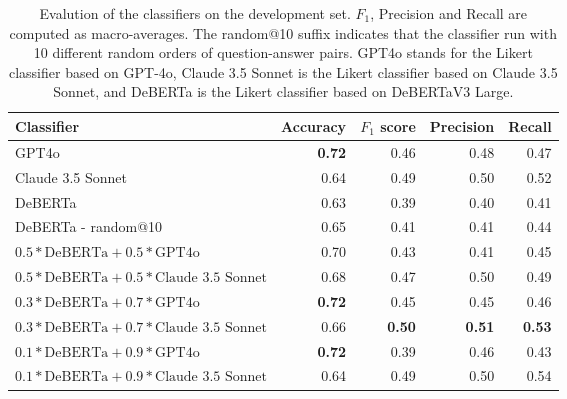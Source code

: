 \begin{table*}
    \centering
    \begin{tabular}{lrrrr}
        \toprule
        Classifier & Accuracy & $F_1$ score & Precision & Recall \\
        \midrule
        GPT4o & \textbf{0.72} & 0.46 & 0.48 & 0.47 \\
        Claude 3.5 Sonnet & 0.64 & 0.49 & 0.50 & 0.52 \\
        DeBERTa & 0.63 & 0.39 & 0.40 & 0.41 \\
        DeBERTa - random@10 & 0.65 & 0.41 & 0.41 & 0.44 \\
        $0.5*\mbox{DeBERTa}+0.5*\mbox{GPT4o}$ & 0.70 & 0.43 & 0.41 & 0.45 \\
        $0.5*\mbox{DeBERTa}+0.5*\mbox{Claude 3.5 Sonnet}$ & 0.68 & 0.47 & 0.50 & 0.49 \\
        $0.3*\mbox{DeBERTa}+0.7*\mbox{GPT4o}$ & \textbf{0.72} & 0.45 & 0.45 & 0.46 \\
        $0.3*\mbox{DeBERTa}+0.7*\mbox{Claude 3.5 Sonnet}$ & 0.66 & \textbf{0.50} & \textbf{0.51} & \textbf{0.53} \\
        $0.1*\mbox{DeBERTa}+0.9*\mbox{GPT4o}$ & \textbf{0.72} & 0.39 & 0.46 & 0.43 \\
        $0.1*\mbox{DeBERTa}+0.9*\mbox{Claude 3.5 Sonnet}$ & 0.64 & 0.49 & 0.50 & 0.54 \\

        \bottomrule
    \end{tabular} 
    \caption{Evalution of the classifiers on the development set. $F_1$, Precision and Recall are computed as macro-averages. The random@10 suffix indicates that the classifier run with 10 different random orders of question-answer pairs. GPT4o stands for the Likert classifier based on GPT-4o, Claude 3.5 Sonnet is the Likert classifier based on Claude 3.5 Sonnet, and DeBERTa is the Likert classifier based on DeBERTaV3 Large.}
    \label{tab:nli}
\end{table*}